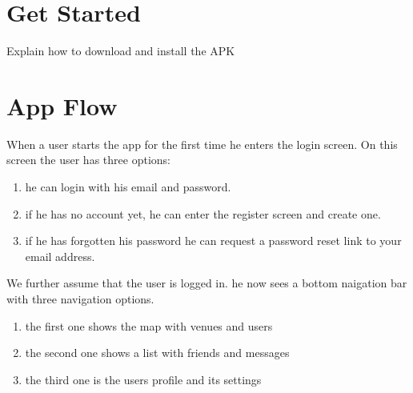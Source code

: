 \documentclass[11pt, accentcolor=tud1c]{tudreport}
\begin{document}
\section{Get Started}
Explain how to download and install the APK
\section{App Flow}
When a user starts the app for the first time he enters the login screen. On this screen the user has three options:
\begin{enumerate}
\item he can login with his email and password.
\item if he has no account yet, he can enter the register screen and create one.
\item if he has forgotten his password he can request a password reset link to your email address.
\end{enumerate}
We further assume that the user is logged in. he now sees a bottom naigation bar with three navigation options.
\begin{enumerate}
\item the first one shows the map with venues and users
\item the second one shows a list with friends and messages
\item the third one is the users profile and its settings
\end{enumerate}
\end{document}
